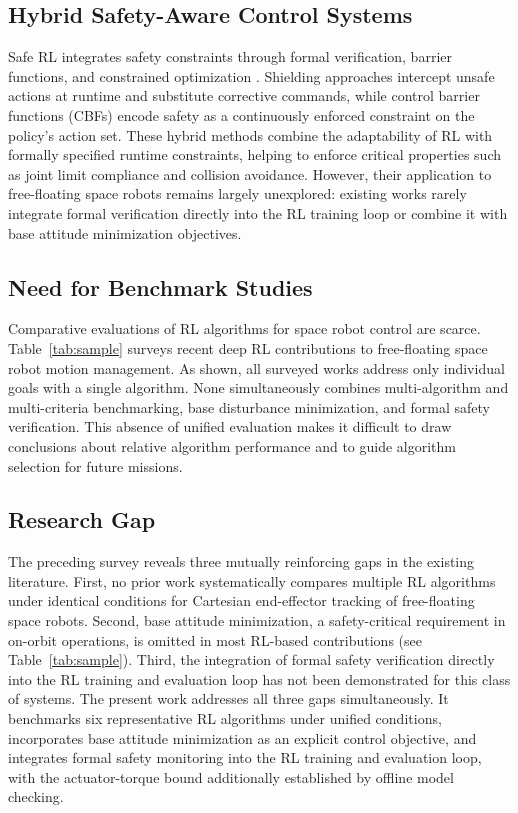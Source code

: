 \documentclass{ieeeaccess}
\begin{document}
\subsection{Hybrid Safety-Aware Control Systems}
Safe RL integrates safety constraints through formal verification,
barrier functions, and constrained optimization \cite{b22,b23,b24,b34}.
Shielding approaches \cite{b23} intercept unsafe actions at runtime and substitute corrective commands,
while control barrier functions (CBFs) \cite{b34} encode safety as a continuously enforced constraint on
the policy's action set.
These hybrid methods combine the adaptability of RL with formally specified runtime constraints, helping
to enforce critical properties such as joint limit compliance
and collision avoidance. However, their application to free-floating space robots remains largely unexplored:
existing works rarely integrate formal verification directly into the RL training loop or combine
it with base attitude minimization objectives.

\subsection{Need for Benchmark Studies}
Comparative evaluations of RL algorithms for space robot control are scarce. Table~\ref{tab:sample} surveys recent
deep RL
contributions to free-floating space robot motion management. As shown, all surveyed works address only
individual
goals with a single algorithm. None simultaneously combines multi-algorithm and multi-criteria benchmarking, base disturbance
minimization,
and formal safety verification. This absence of unified evaluation makes it difficult to draw
conclusions about relative
algorithm performance and to guide algorithm selection for future missions.

\subsection{Research Gap}
The preceding survey reveals three mutually reinforcing gaps in the existing literature. First, no
prior work systematically compares multiple RL algorithms under identical conditions for Cartesian end-effector tracking
of free-floating space robots. Second, base attitude minimization, a safety-critical requirement in on-orbit operations,
is omitted in most RL-based
contributions (see Table~\ref{tab:sample}). Third, the integration of formal safety verification directly into the RL
training and evaluation loop has not been demonstrated for this class of systems. The
present work addresses all
three gaps simultaneously. It benchmarks six representative RL algorithms under unified conditions, incorporates base
attitude minimization as an explicit control objective, and integrates formal safety monitoring into the
RL training and
evaluation loop, with the actuator-torque bound additionally established by offline model checking.
\end{document}
